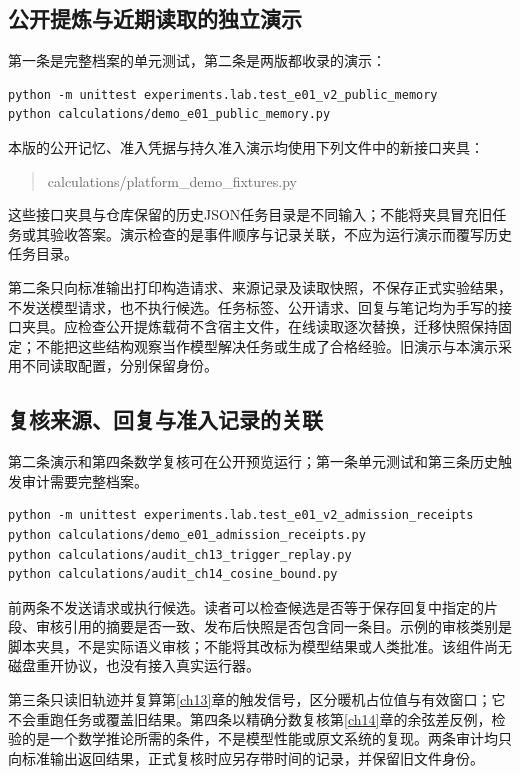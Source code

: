 \subsection{公开提炼与近期读取的独立演示}

第一条是完整档案的单元测试，第二条是两版都收录的演示：
\begin{verbatim}
python -m unittest experiments.lab.test_e01_v2_public_memory
python calculations/demo_e01_public_memory.py
\end{verbatim}

本版的公开记忆、准入凭据与持久准入演示均使用下列文件中的新接口夹具：
\begin{quote}\ttfamily\small
calculations/\allowbreak platform\_demo\_fixtures.py
\end{quote}
这些接口夹具与仓库保留的历史JSON任务目录是不同输入；不能将夹具冒充旧任务或其验收答案。演示检查的是事件顺序与记录关联，不应为运行演示而覆写历史任务目录。

第二条只向标准输出打印构造请求、来源记录及读取快照，不保存正式实验结果，不发送模型请求，也不执行候选。任务标签、公开请求、回复与笔记均为手写的接口夹具。应检查公开提炼载荷不含宿主文件，在线读取逐次替换，迁移快照保持固定；不能把这些结构观察当作模型解决任务或生成了合格经验。旧演示与本演示采用不同读取配置，分别保留身份。

\subsection{复核来源、回复与准入记录的关联}

第二条演示和第四条数学复核可在公开预览运行；第一条单元测试和第三条历史触发审计需要完整档案。
\begin{verbatim}
python -m unittest experiments.lab.test_e01_v2_admission_receipts
python calculations/demo_e01_admission_receipts.py
python calculations/audit_ch13_trigger_replay.py
python calculations/audit_ch14_cosine_bound.py
\end{verbatim}

前两条不发送请求或执行候选。读者可以检查候选是否等于保存回复中指定的片段、审核引用的摘要是否一致、发布后快照是否包含同一条目。示例的审核类别是脚本夹具，不是实际语义审核；不能将其改标为模型结果或人类批准。该组件尚无磁盘重开协议，也没有接入真实运行器。

第三条只读旧轨迹并复算第\ref{ch13}章的触发信号，区分暖机占位值与有效窗口；它不会重跑任务或覆盖旧结果。第四条以精确分数复核第\ref{ch14}章的余弦差反例，检验的是一个数学推论所需的条件，不是模型性能或原文系统的复现。两条审计均只向标准输出返回结果，正式复核时应另存带时间的记录，并保留旧文件身份。


